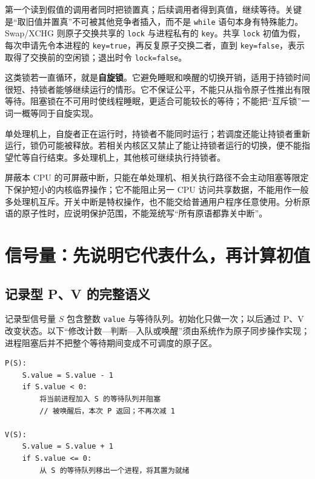 第一个读到假值的调用者同时把锁置真；后续调用者得到真值，继续等待。关键是``取旧值并置真''不可被其他竞争者插入，而不是 \allowbreak{}\texttt{while} 语句本身有特殊能力。Swap/XCHG 则原子交换共享的 \allowbreak{}\texttt{lock} 与进程私有的 \allowbreak{}\texttt{key}。共享 \allowbreak{}\texttt{lock} 初值为假，每次申请先令本进程的 \allowbreak{}\texttt{key=true}，再反复原子交换二者，直到 \allowbreak{}\texttt{key=false}，表示取得了交换前的空闲锁；退出时令 \allowbreak{}\texttt{lock=false}。

这类锁若一直循环，就是\textbf{自旋锁}。它避免睡眠和唤醒的切换开销，适用于持锁时间很短、持锁者能够继续运行的情形。它不保证公平，不能只从指令原子性推出有限等待。阻塞锁在不可用时使线程睡眠，更适合可能较长的等待；不能把``互斥锁''一词一概等同于自旋实现。

单处理机上，自旋者正在运行时，持锁者不能同时运行；若调度还能让持锁者重新运行，锁仍可能被释放。若相关内核区又禁止了能让持锁者运行的切换，便不能指望忙等自行结束。多处理机上，其他核可继续执行持锁者。

屏蔽本 CPU 的可屏蔽中断，只能在单处理机、相关执行路径不会主动阻塞等限定下保护短小的内核临界操作；它不能阻止另一 CPU 访问共享数据，不能用作一般多处理机互斥。开关中断是特权操作，也不能交给普通用户程序任意使用。分析原语的原子性时，应说明保护范围，不能笼统写``所有原语都靠关中断''。

\section{信号量：先说明它代表什么，再计算初值}\label{sec-semaphore}

\subsection{记录型 P、V 的完整语义}\label{os-c03-h106}

记录型信号量 \(S\) 包含整数 \allowbreak{}\texttt{value} 与等待队列。初始化只做一次；以后通过 P、V 改变状态。以下``修改计数---判断---入队或唤醒''须由系统作为原子同步操作实现；进程阻塞后并不把整个等待期间变成不可调度的原子区。

\par\medskip\noindent
\begin{minipage}{\linewidth}
\begin{verbatim}
P(S):
    S.value = S.value - 1
    if S.value < 0:
        将当前进程加入 S 的等待队列并阻塞
        // 被唤醒后，本次 P 返回；不再次减 1

V(S):
    S.value = S.value + 1
    if S.value <= 0:
        从 S 的等待队列移出一个进程，将其置为就绪
\end{verbatim}
\end{minipage}\par\medskip

